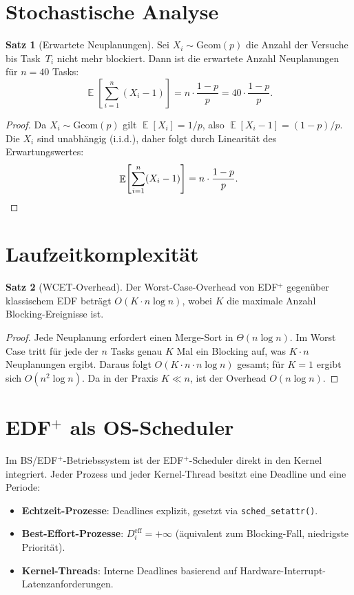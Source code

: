 ﻿\documentclass[a4paper,12pt]{scrreprt}
\theoremstyle{definition}
\newtheorem{satz}{Satz}[chapter]
\DeclareMathOperator{\E}{\mathbb{E}}
\begin{document}
	\section{Stochastische Analyse}
	
	\begin{satz}[Erwartete Neuplanungen]\label{satz:reprob}
		Sei $X_i \sim \mathrm{Geom}(p)$ die Anzahl der Versuche bis Task~$T_i$
		nicht mehr blockiert. Dann ist die erwartete Anzahl Neuplanungen für
		$n = 40$ Tasks:
		\[
		\E\!\left[\sum_{i=1}^{n} (X_i - 1)\right]
		= n \cdot \frac{1-p}{p}
		= 40 \cdot \frac{1-p}{p}.
		\]
	\end{satz}
	
	\begin{proof}
		Da $X_i \sim \mathrm{Geom}(p)$ gilt $\E[X_i] = 1/p$, also
		$\E[X_i - 1] = (1-p)/p$. Die $X_i$ sind unabhängig (i.i.d.), daher
		folgt durch Linearität des Erwartungswertes:
		\[
		\E\!\left[\sum_{i=1}^{n}(X_i-1)\right]
		= n \cdot \frac{1-p}{p}. \qedhere
		\]
	\end{proof}
	
	\section{Laufzeitkomplexität}
	
	\begin{satz}[WCET-Overhead]\label{satz:wcet}
		Der Worst-Case-Overhead von EDF$^+$ gegenüber klassischem EDF beträgt
		$O(K \cdot n \log n)$, wobei $K$ die maximale Anzahl Blocking-Ereignisse
		ist.
	\end{satz}
	
	\begin{proof}
		Jede Neuplanung erfordert einen Merge-Sort in $\Theta(n \log n)$. Im
		Worst Case tritt für jede der $n$ Tasks genau $K$ Mal ein Blocking auf,
		was $K \cdot n$ Neuplanungen ergibt. Daraus folgt
		$O(K \cdot n \cdot n \log n)$ gesamt; für $K = 1$ ergibt sich
		$O(n^2 \log n)$. Da in der Praxis $K \ll n$, ist der Overhead $O(n \log n)$.
	\end{proof}
	
	\section{\texorpdfstring{EDF$^+$}{EDF+} als OS-Scheduler}

	Im BS/EDF$^+$-Betriebssystem ist der EDF$^+$-Scheduler direkt in den
	Kernel integriert. Jeder Prozess und jeder Kernel-Thread besitzt eine
	Deadline und eine Periode:
	\begin{itemize}
		\item \textbf{Echtzeit-Prozesse}: Deadlines explizit, gesetzt via
		\texttt{sched\_setattr()}.
		\item \textbf{Best-Effort-Prozesse}: $D_i^{\mathrm{eff}} = +\infty$
		(äquivalent zum Blocking-Fall, niedrigste Priorität).
		\item \textbf{Kernel-Threads}: Interne Deadlines basierend auf
		Hardware-Interrupt-Latenzanfor\-derungen.
	\end{itemize}
\end{document}
